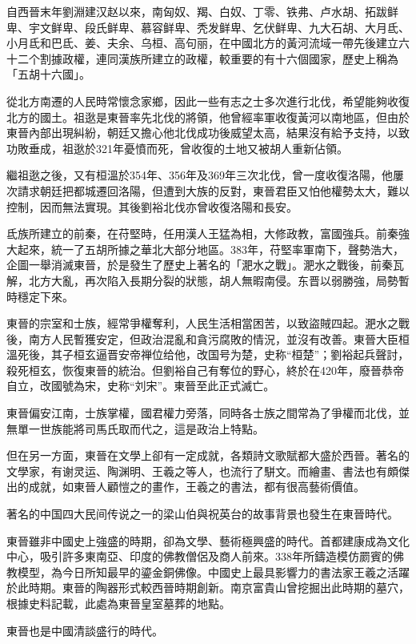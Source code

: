 自西晉末年劉淵建汉赵以來，南匈奴、羯、白奴、丁零、铁弗、卢水胡、拓跋鲜卑、宇文鲜卑、段氏鲜卑、慕容鲜卑、秃发鲜卑、乞伏鲜卑、九大石胡、大月氐、小月氐和巴氐、姜、夫余、乌桓、高句丽，在中國北方的黃河流域一帶先後建立六十二个割據政權，連同漢族所建立的政權，較重要的有十六個國家，歷史上稱為「五胡十六國」。

從北方南遷的人民時常懷念家鄉，因此一些有志之士多次進行北伐，希望能夠收復北方的國土。祖逖是東晉率先北伐的將領，他曾經率軍收復黃河以南地區，但由於東晉內部出現糾紛，朝廷又擔心他北伐成功後威望太高，結果沒有給予支持，以致功敗垂成，祖逖於321年憂憤而死，曾收復的土地又被胡人重新佔領。

繼祖逖之後，又有桓溫於354年、356年及369年三次北伐，曾一度收復洛陽，他屢次請求朝廷把都城遷回洛陽，但遭到大族的反對，東晉君臣又怕他權勢太大，難以控制，因而無法實現。其後劉裕北伐亦曾收復洛陽和長安。

氐族所建立的前秦，在苻堅時，任用漢人王猛為相，大修政教，富國強兵。前秦強大起來，統一了五胡所據之華北大部分地區。383年，苻堅率軍南下，聲勢浩大，企圖一舉消滅東晉，於是發生了歷史上著名的「淝水之戰」。淝水之戰後，前秦瓦解，北方大亂，再次陷入長期分裂的狀態，胡人無暇南侵。东晋以弱勝強，局勢暫時穩定下來。

東晉的宗室和士族，經常爭權奪利，人民生活相當困苦，以致盜賊四起。淝水之戰後，南方人民暫獲安定，但政治混亂和貪污腐敗的情況，並沒有改善。東晉大臣桓溫死後，其子桓玄逼晋安帝禅位给他，改国号为楚，史称“桓楚”；劉裕起兵聲討，殺死桓玄，恢復東晉的統治。但劉裕自己有奪位的野心，終於在420年，廢晉恭帝自立，改國號為宋，史称“刘宋”。東晉至此正式滅亡。

東晉偏安江南，士族掌權，國君權力旁落，同時各士族之間常為了爭權而北伐，並無單一世族能將司馬氏取而代之，這是政治上特點。

但在另一方面，東晉在文學上卻有一定成就，各類詩文歌賦都大盛於西晉。著名的文學家，有谢灵运、陶渊明、王羲之等人，也流行了駢文。而繪畫、書法也有頗傑出的成就，如東晉人顧愷之的畫作，王羲之的書法，都有很高藝術價值。

著名的中国四大民间传说之一的梁山伯與祝英台的故事背景也發生在東晉時代。

東晉雖非中國史上強盛的時期，卻為文學、藝術極興盛的時代。首都建康成為文化中心，吸引許多東南亞、印度的佛教僧侶及商人前來。338年所鑄造模仿罽賓的佛教模型，為今日所知最早的鎏金銅佛像。中國史上最具影響力的書法家王羲之活躍於此時期。東晉的陶器形式較西晉時期創新。南京富貴山曾挖掘出此時期的墓穴，根據史料記載，此處為東晉皇室墓葬的地點。

東晉也是中國清談盛行的時代。














